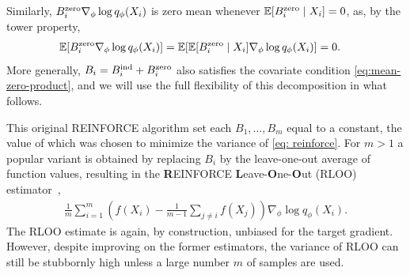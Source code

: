 \documentclass[12pt,paper=letter]{scrreprt}
\def\mbb#1{\mathbb{#1}}
\def\E{\mbb{E}} %
\newcommand{\grad}{\nabla} %
\begin{document}
Similarly, $B_i^{\textup{zero}}\grad_{\phi} \log q_\phi(X_i)$ is zero mean whenever  $\E[B_i^{\textup{zero}}\mid X_i] = 0$, as, by the tower property, 
\begin{align*}
    \mathbb{E}[B_i^{\textup{zero}} \nabla_\phi \log q_\phi(X_i)] 
    & =     \mathbb{E}[\E[B_i^{\textup{zero}}\mid X_i] \nabla_\phi \log q_\phi(X_i)] = 0.
\end{align*}
More generally, $B_i = B_i^{\textup{ind}}+B_i^{\textup{zero}}$ also satisfies the covariate condition \cref{eq:mean-zero-product}, and we will use the full flexibility of this decomposition in what follows.

This original REINFORCE algorithm set each $B_1,\dots,B_m$ equal to a constant, the value of which was chosen to minimize the variance of \eqref{eq: reinforce}.
For $m > 1$ a popular variant is obtained by replacing $B_i$ by the leave-one-out average of function values, resulting in the \textbf{R}EINFORCE \textbf{L}eave-\textbf{O}ne-\textbf{O}ut (RLOO)  estimator~\citep{salimans2014using,Kool2019Buy4R,richter2020},
\begin{align} \label{eq:rloo}
	\frac{1}{m}\sum_{i=1}^m \left(f(X_i) - \frac{1}{m-1}\sum_{j\neq i} f(X_j)\right) \nabla_\phi \log q_\phi (X_i).
\end{align}
The RLOO estimate is again, by construction, unbiased for the target gradient.
However, despite improving on the former estimators, the variance of RLOO can still be stubbornly high unless a large number $m$ of samples are used. 
\end{document}
